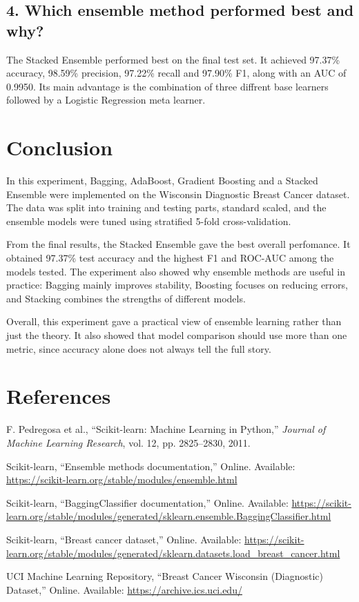 \documentclass[12pt,a4paper]{article}
\begin{document}
\subsection*{4. Which ensemble method performed best and why?}
The Stacked Ensemble performed best on the final test set. It achieved 97.37\% accuracy, 98.59\% precision, 97.22\% recall and 97.90\% F1, along with an AUC of 0.9950. Its main advantage is the combination of three diffrent base learners followed by a Logistic Regression meta learner.

\section{Conclusion}
In this experiment, Bagging, AdaBoost, Gradient Boosting and a Stacked Ensemble were implemented on the Wisconsin Diagnostic Breast Cancer dataset. The data was split into training and testing parts, standard scaled, and the ensemble models were tuned using stratified 5-fold cross-validation.

From the final results, the Stacked Ensemble gave the best overall perfomance. It obtained 97.37\% test accuracy and the highest F1 and ROC-AUC among the models tested. The experiment also showed why ensemble methods are useful in practice: Bagging mainly improves stability, Boosting focuses on reducing errors, and Stacking combines the strengths of different models.

Overall, this experiment gave a practical view of ensemble learning rather than just the theory. It also showed that model comparison should use more than one metric, since accuracy alone does not always tell the full story.

\section{References}
\begin{enumerate}[label={[\arabic*]}]
\item F. Pedregosa et al., ``Scikit-learn: Machine Learning in Python,'' \textit{Journal of Machine Learning Research}, vol. 12, pp. 2825--2830, 2011.
\item Scikit-learn, ``Ensemble methods documentation,'' Online. Available: \url{https://scikit-learn.org/stable/modules/ensemble.html}
\item Scikit-learn, ``BaggingClassifier documentation,'' Online. Available: \url{https://scikit-learn.org/stable/modules/generated/sklearn.ensemble.BaggingClassifier.html}
\item Scikit-learn, ``Breast cancer dataset,'' Online. Available: \url{https://scikit-learn.org/stable/modules/generated/sklearn.datasets.load_breast_cancer.html}
\item UCI Machine Learning Repository, ``Breast Cancer Wisconsin (Diagnostic) Dataset,'' Online. Available: \url{https://archive.ics.uci.edu/}
\end{enumerate}
\end{document}
